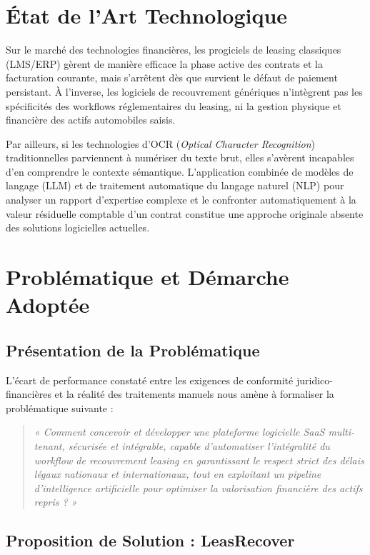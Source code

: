 \section{État de l'Art Technologique}

Sur le marché des technologies financières, les progiciels de leasing classiques (LMS/ERP) gèrent de manière efficace la phase active des contrats et la facturation courante, mais s'arrêtent dès que survient le défaut de paiement persistant. À l'inverse, les logiciels de recouvrement génériques n'intègrent pas les spécificités des workflows réglementaires du leasing, ni la gestion physique et financière des actifs automobiles saisis.

Par ailleurs, si les technologies d'OCR (\textit{Optical Character Recognition}) traditionnelles parviennent à numériser du texte brut, elles s'avèrent incapables d'en comprendre le contexte sémantique. L'application combinée de modèles de langage (LLM) et de traitement automatique du langage naturel (NLP) pour analyser un rapport d'expertise complexe et le confronter automatiquement à la valeur résiduelle comptable d'un contrat constitue une approche originale absente des solutions logicielles actuelles.

\section{Problématique et Démarche Adoptée}

\subsection{Présentation de la Problématique}

L'écart de performance constaté entre les exigences de conformité juridico-financières et la réalité des traitements manuels nous amène à formaliser la problématique suivante :

\begin{quote}
\textit{« Comment concevoir et développer une plateforme logicielle SaaS multi-tenant, sécurisée et intégrable, capable d'automatiser l'intégralité du workflow de recouvrement leasing en garantissant le respect strict des délais légaux nationaux et internationaux, tout en exploitant un pipeline d'intelligence artificielle pour optimiser la valorisation financière des actifs repris ? »}
\end{quote}

\subsection{Proposition de Solution : LeasRecover}

